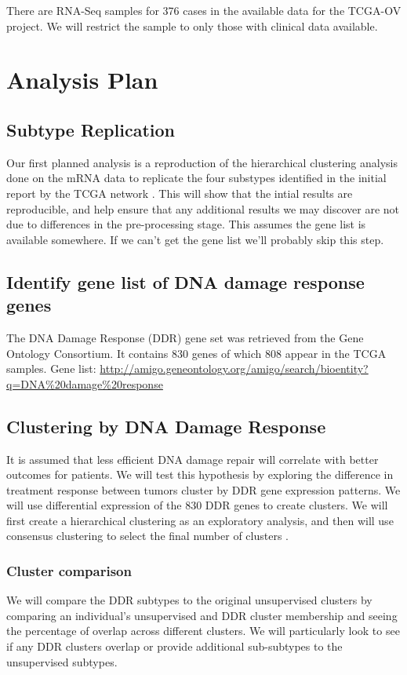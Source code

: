 \documentclass{article}
\begin{document}
There are RNA-Seq samples for 376 cases in the available data for the TCGA-OV project. We will restrict the sample to only those with clinical data available. 



\section{Analysis Plan}

\subsection{Subtype Replication}
   Our first planned analysis is a reproduction of the hierarchical clustering analysis\cite{eisen_cluster_1998} done on the mRNA data to replicate the four substypes identified in the initial report by the TCGA network \cite{cancer2011integrated}. This will show that the intial results are reproducible, and help ensure that any additional results we may discover are not due to differences in the pre-processing stage. This assumes the gene list is available somewhere. If we can't get the gene list we'll probably skip this step. 
   
\subsection{Identify gene list of DNA damage response genes}

The DNA Damage Response (DDR) gene set was retrieved from the Gene Ontology Consortium.  It contains 830 genes of which 808 appear in the TCGA samples.
Gene list: \url{http://amigo.geneontology.org/amigo/search/bioentity?q=DNA\%20damage\%20response}


\subsection{Clustering by DNA Damage Response}
  It is assumed that less efficient DNA damage repair will correlate with better outcomes for patients. We will test this hypothesis by exploring the difference in treatment response between tumors cluster by DDR gene expression patterns. We will use differential expression of the 830 DDR genes to create clusters. We will first create a hierarchical clustering as an exploratory analysis, and then will use consensus clustering to select the final number of clusters \cite{monti_consensus_2003}. 

\subsubsection{Cluster comparison}
  We will compare the DDR subtypes to the original unsupervised clusters by comparing an individual's unsupervised and DDR cluster membership and seeing the percentage of overlap across different clusters. We will particularly look to see if any DDR clusters overlap or provide additional sub-subtypes to the unsupervised subtypes. 
 
\end{document}
